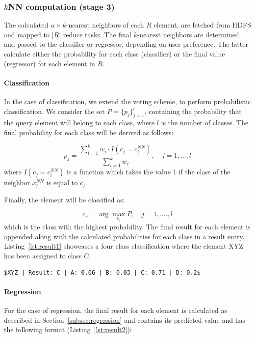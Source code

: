 \subsubsection{\texorpdfstring{$k$}NNN computation (stage 3)}
\label{par:algorithmic3}
The calculated  $\alpha \times k$-nearest neighbors of each $R$ element, are fetched from HDFS and mapped to $|R|$ reduce tasks. The final $k$-nearest neighbors are determined and passed to the classifier or regressor, depending on user preference. The latter calculate either the probability for each class (classifier) or the final value (regressor) for each element in $R$.

\paragraph{Classification} In the case of classification, we extend the voting scheme, to perform probabilistic classification. We consider the set $P = \{p_{j}\}_{j=1}^{l}$, containing the probability that the query element will belong to each class, where $l$ is the number of classes. The final probability for each class will be derived as follows:

\begin{equation}
	p_{j} = \frac{\sum_{i=1}^{k} w_{i} \cdot I(c_{j} = c_{i}^{NN})}{\sum_{i=1}^{k} w_{i}}, \quad j=1, ..., l
\end{equation}
where $I(c_{j} = c_{i}^{NN})$ is a function which takes the value 1 if the class of the neighbor $x_{i}^{NN}$ is equal to $c_{j}$. 

Finally, the element will be classified as:

\begin{equation} 
	c_{r} = \arg \max_{c_{j}} P, \quad j=1, ...., l
\end{equation}
which is the class with the highest probability. The final result for each element is appended along with the calculated probabilities for each class in a result entry. Listing~\ref{lst:result1} showcases a four class classification where the element XYZ has been assigned to class $C$.

\begin{lstlisting}[caption={The element XYZ is classified to class C, which has the highest probability.}, label={lst:result1}, mathescape=true]
$XYZ | Result: C | A: 0.06 | B: 0.03 | C: 0.71 | D: 0.2$
\end{lstlisting}

\paragraph{Regression} For the case of regression, the final result for each element is calculated as described in Section~\ref{subsec:regression} and contains its predicted value and has the following format (Listing~\ref{lst:result2}):

